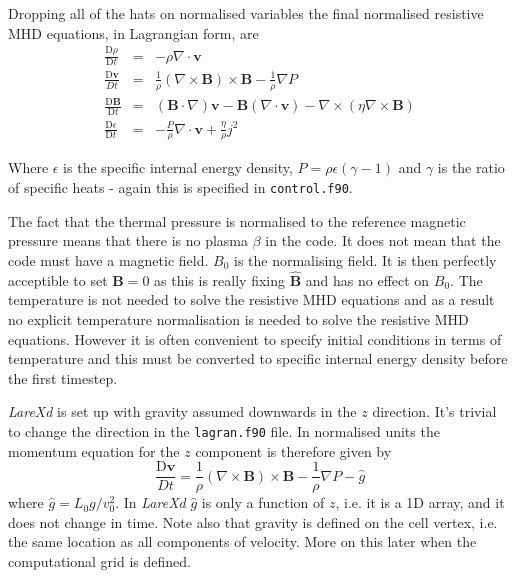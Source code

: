 \documentclass[11pt]{article}
\begin{document}
Dropping all of the hats on normalised variables the final normalised resistive MHD equations, in Lagrangian form, are
\begin{eqnarray}
\frac{\mathrm{D}\rho}{\mathrm{D}t}&=&-\rho \nabla\cdot \mathbf{v}\\
\frac{\mathrm{D}\mathbf{v}}{Dt}&=&\frac{1}{\rho}(\nabla\times\mathbf{B})\times\mathbf{B}
-\frac{1}{\rho}\nabla P \label{velocity_eqn}\\
\frac{\mathrm{D}\mathbf{B}}{\mathrm{D}t}&=&(\mathbf{B}\cdot\nabla)\mathbf{v}-\mathbf{B}
(\nabla\cdot\mathbf{v})-\nabla\times(\eta\nabla\times\mathbf{B})\\
\frac{\mathrm{D}\epsilon}{\mathrm{D}t}&=&-\frac{P}{\rho}\nabla\cdot\mathbf{v}+\frac
{\eta}{\rho}j^{2} \label{energy_eqn}
\end{eqnarray}

Where $\epsilon$ is the specific internal energy density, $P = \rho \epsilon(\gamma - 1)$ and $\gamma$ is the ratio of specific heats - again this is specified in \texttt{control.f90}.

The fact that the thermal pressure is normalised to the reference magnetic pressure means that there is no plasma $\beta$ in the code. It does not mean that the code must have a magnetic field. $B_0$ is the normalising field. It is then perfectly acceptible to set $\mathbf{B}=0$ as this is really fixing $\hat{\mathbf{B}}$ and has no effect on  $B_0$. The temperature is not needed to solve the resistive MHD equations and as a result no explicit temperature normalisation is needed to solve the resistive MHD equations. However it is often convenient to specify initial conditions in terms of temperature and this must be converted to specific internal energy density before the first timestep.

{\it LareXd} is set up with gravity assumed downwards in the $z$ direction. It's trivial to change the direction in the \texttt{lagran.f90} file. In normalised units the momentum equation for the $z$ component is therefore given by
\begin{displaymath}
 \frac{\mathrm{D}\mathbf{v}}{Dt}=\frac{1}{\rho}(\nabla\times\mathbf{B})\times\mathbf{B}
-\frac{1}{\rho}\nabla P-\hat{g}
\end{displaymath}
where $\hat{g}=L_0 g / v_0^2$. In {\it LareXd} $\hat{g}$ is only a function of $z$, i.e. it is a 1D array, and it does not change in time. Note also that gravity is defined on the cell vertex, i.e. the same location as all components of velocity. More on this later when the computational grid is defined.
\end{document}
